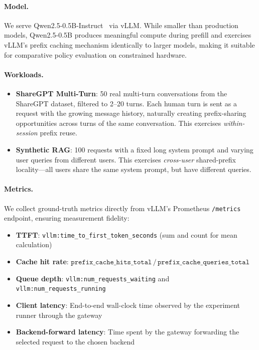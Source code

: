 \documentclass{article}
\begin{document}
\paragraph{Model.} We serve Qwen2.5-0.5B-Instruct~\citep{qwen2025} via vLLM. While smaller than production models, Qwen2.5-0.5B produces meaningful compute during prefill and exercises vLLM's prefix caching mechanism identically to larger models, making it suitable for comparative policy evaluation on constrained hardware.

\paragraph{Workloads.}

\begin{itemize}
    \item \textbf{ShareGPT Multi-Turn}: 50 real multi-turn conversations from the ShareGPT dataset, filtered to 2--20 turns. Each human turn is sent as a request with the growing message history, naturally creating prefix-sharing opportunities across turns of the same conversation. This exercises \emph{within-session} prefix reuse.
    \item \textbf{Synthetic RAG}: 100 requests with a fixed long system prompt and varying user queries from different users. This exercises \emph{cross-user} shared-prefix locality---all users share the same system prompt, but have different queries.
\end{itemize}

\paragraph{Metrics.} We collect ground-truth metrics directly from vLLM's Prometheus \texttt{/metrics} endpoint, ensuring measurement fidelity:
\begin{itemize}
    \item \textbf{TTFT}: \texttt{vllm:time\_to\_first\_token\_seconds} (sum and count for mean calculation)
    \item \textbf{Cache hit rate}: $\texttt{prefix\_cache\_hits\_total} \,/\, \texttt{prefix\_cache\_queries\_total}$
    \item \textbf{Queue depth}: \texttt{vllm:num\_requests\_waiting} and \texttt{vllm:num\_requests\_running}
    \item \textbf{Client latency}: End-to-end wall-clock time observed by the experiment runner through the gateway
    \item \textbf{Backend-forward latency}: Time spent by the gateway forwarding the selected request to the chosen backend
\end{itemize}
\end{document}
